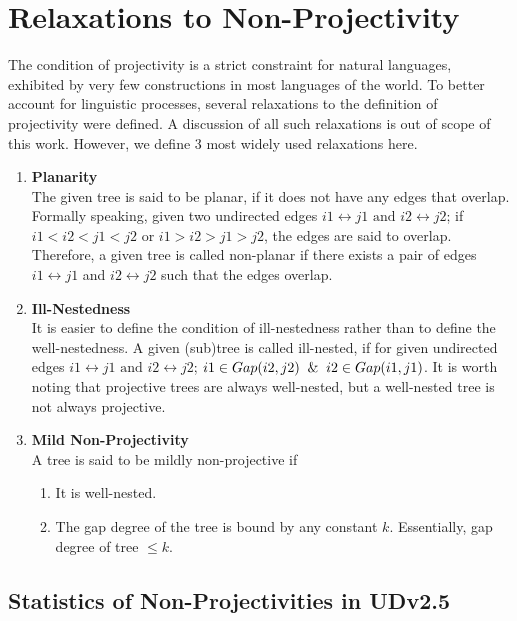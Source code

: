 \newpage
\section{Relaxations to Non-Projectivity}
\label{app:nonproj-relaxations}

The condition of projectivity is a strict constraint for natural languages, exhibited by very few constructions in most languages of the world. To better account for linguistic processes, several relaxations to the definition of projectivity were defined. A discussion of all such relaxations is out of scope of this work. However, we define 3 most widely used relaxations here.

\begin{enumerate}
    \item \textbf{Planarity}\\
    The given tree is said to be planar, if it does not have any edges that overlap. Formally speaking, given two undirected edges \(i1 \leftrightarrow j1 \text{ and } i2 \leftrightarrow j2\); if \(i1 < i2 < j1 < j2\) or \(i1 > i2 > j1 > j2\), the edges are said to overlap.
    Therefore, a given tree is called non-planar if there exists a pair of edges \(i1 \leftrightarrow j1\) and \(i2 \leftrightarrow j2\) such that the edges overlap.
    \item \textbf{Ill-Nestedness}\\
    It is easier to define the condition of ill-nestedness rather than to define the well-nestedness. A given (sub)tree is called ill-nested, if for given undirected edges \(i1 \leftrightarrow j1 \text{ and } i2 \leftrightarrow j2\); \(i1 \in Gap(i2,j2) \And i2 \in Gap(i1,j1)\). It is worth noting that projective trees are always well-nested, but a well-nested tree is not always projective.
    \item \textbf{Mild Non-Projectivity}\\
    A tree is said to be mildly non-projective if
    \begin{enumerate}
        \item It is well-nested.
        \item The gap degree of the tree is bound by any constant \(k\). Essentially, gap degree of tree \(\leq k\).
    \end{enumerate}
\end{enumerate}

\subsection{Statistics of Non-Projectivities in UDv2.5}

